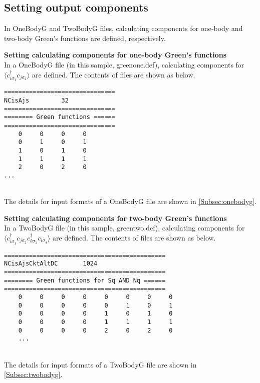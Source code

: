 \subsection{Setting output components}
In OneBodyG and TwoBodyG files, calculating components for one-body and two-body Green's functions are defined, respectively. 
\begin{description}
\item {\bf Setting calculating components for one-body Green's functions}\\
In a OneBodyG file (in this sample, greenone.def), calculating components for $\langle c_{i\sigma_1}^{\dag}c_{j\sigma_2} \rangle$ are defined. The contents of files are shown as below.\\
\begin{minipage}{15cm}
\begin{screen}
\begin{verbatim}
===============================
NCisAjs         32
===============================
======== Green functions ======
===============================
    0     0     0     0
    0     1     0     1
    1     0     1     0
    1     1     1     1
    2     0     2     0
...
\end{verbatim}
\end{screen}
\end{minipage}
~\\
The details for input formats of a OneBodyG file are shown in \ref{Subsec:onebodyg}.
\item {\bf Setting calculating components for two-body Green's functions}\\
In a TwoBodyG file (in this sample, greentwo.def), calculating components for $\langle c_{i\sigma_1}^{\dag}c_{j\sigma_2}c_{k\sigma_3}^{\dag}c_{l\sigma_4} \rangle$ are defined. The contents of files are shown as below.\\
\begin{minipage}{15cm}
\begin{screen}
\begin{verbatim}
=============================================
NCisAjsCktAltDC       1024
=============================================
======== Green functions for Sq AND Nq ======
=============================================
    0     0     0     0     0     0     0     0
    0     0     0     0     0     1     0     1
    0     0     0     0     1     0     1     0
    0     0     0     0     1     1     1     1
    0     0     0     0     2     0     2     0
    ...
\end{verbatim}
\end{screen}
\end{minipage}
~\\
The details for input formats of a TwoBodyG file are shown in \ref{Subsec:twobodyg}.
\end{description}

